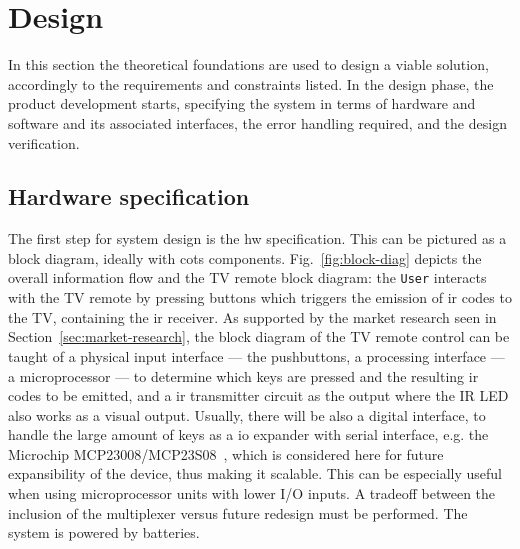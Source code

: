 \chapter{Design}
\label{ch:design}
In this section the theoretical foundations are used to design a viable
solution, accordingly to the requirements and constraints listed.
In the design phase, the product development starts, specifying the system in
terms of hardware and software and its associated interfaces, the error handling
required, and the design verification.
%
  \vspace{-5mm}
%  
\section{Hardware specification}
\label{sec:hw-specs}
The first step for system design is the \gls{hw} specification. This can be
pictured as a block diagram, ideally with \gls{cots}
components. Fig.~\ref{fig:block-diag} depicts the overall information flow and
the TV remote block diagram: the \texttt{User} interacts with
the TV remote by pressing buttons which triggers the emission of \gls{ir} codes
to the TV, containing the \gls{ir} receiver. As supported by the market research
seen in
Section~\ref{sec:market-research}, the block diagram of the TV remote control
can be taught of a physical input interface --- the pushbuttons, a processing
interface --- a microprocessor --- to determine which keys are pressed and the
resulting \gls{ir} codes to be emitted, and a \gls{ir} transmitter circuit as
the output where the IR LED also works as a visual output. Usually, there will
be also a digital interface, to handle the large amount of keys as a
\gls{io} expander with serial interface, e.g. the Microchip MCP23008/MCP23S08~\cite{microchip}, which is considered here for future expansibility of the device,
thus making it scalable. This can be especially useful when using
microprocessor units with lower I/O inputs. A tradeoff between the inclusion of
the multiplexer versus future redesign must be performed. The system is powered
by batteries.

